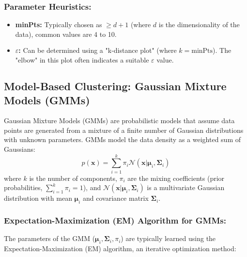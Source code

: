 \documentclass{article}
\begin{document}
\begin{multicols}{2}
	\subsubsection{Parameter Heuristics:}
	\begin{itemize}
		\item \textbf{minPts:} Typically chosen as $\ge d+1$ (where $d$ is the dimensionality of the data), common values are 4 to 10.
		\item \textbf{$\varepsilon$:} Can be determined using a "k-distance plot" (where $k = \text{minPts}$). The "elbow" in this plot often indicates a suitable $\varepsilon$ value.
	\end{itemize}

	\subsection{Model-Based Clustering: Gaussian Mixture Models (GMMs)}
	Gaussian Mixture Models (GMMs) are probabilistic models that assume data points are generated from a mixture of a finite number of Gaussian distributions with unknown parameters. GMMs model the data density as a weighted sum of Gaussians:
	$$
		p(\mathbf{x}) = \sum_{i=1}^{k} \pi_i \mathcal{N}(\mathbf{x} | \boldsymbol{\mu}_i, \boldsymbol{\Sigma}_i)
	$$
	where $k$ is the number of components, $\pi_i$ are the mixing coefficients (prior probabilities, $\sum_{i=1}^{k} \pi_i = 1$), and $\mathcal{N}(\mathbf{x} | \boldsymbol{\mu}_i, \boldsymbol{\Sigma}_i)$ is a multivariate Gaussian distribution with mean $\boldsymbol{\mu}_i$ and covariance matrix $\boldsymbol{\Sigma}_i$.

	\subsubsection{Expectation-Maximization (EM) Algorithm for GMMs:}
	The parameters of the GMM ($\boldsymbol{\mu}_i, \boldsymbol{\Sigma}_i, \pi_i$) are typically learned using the Expectation-Maximization (EM) algorithm, an iterative optimization method:


\end{multicols}
\end{document}
